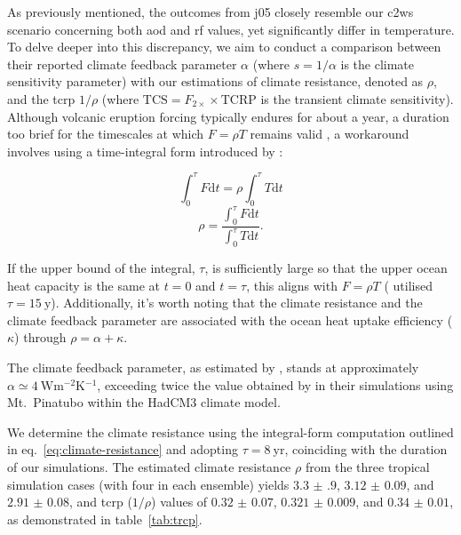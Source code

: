 \documentclass{ametsocV6.1}
\begin{document}
As previously mentioned, the outcomes from \gls{j05} closely resemble our \gls{c2ws}
scenario concerning both \gls{aod} and \gls{rf} values, yet significantly differ in
temperature. To delve deeper into this discrepancy, we aim to conduct a comparison
between their reported climate feedback parameter \(\alpha \) (where \(s=1/\alpha \) is
the climate sensitivity parameter) with our estimations of climate resistance, denoted
as \(\rho \), and the \gls{tcrp} \(1/\rho\) (where \(\mathrm{TCS}=F_{2\times}\times
\mathrm{TCRP}\) is the transient climate sensitivity). Although volcanic eruption
forcing typically endures for about a year, a duration too brief for the timescales at
which \(F=\rho T\) remains valid \citep{gregory2016}, a workaround involves using a
time-integral form introduced by \citet{merlis2014}:

\begin{equation}
  \int_0^{\tau}F \mathrm{d}t=\rho\int_{0}^{\tau}T \mathrm{d}t
\end{equation}
\begin{equation}
  \rho=\frac{\int_0^{\tau}F \mathrm{d}t}{\int_{0}^{\tau}T \mathrm{d}t}.
  \label{eq:climate-resistance}
\end{equation}

If the upper bound of the integral, \(\tau \), is sufficiently large so that the upper
ocean heat capacity is the same at \(t=0\) and \(t=\tau \), this aligns with \(F=\rho
T\) \citep{gregory2016} (\citet{merlis2014} utilised \(\tau =\SI{15}{\mathrm{y}}\)).
Additionally, it's worth noting that the climate resistance and the climate feedback
parameter are associated with the ocean heat uptake efficiency (\(\kappa \)) through
\(\rho =\alpha +\kappa \).

The climate feedback parameter, as estimated by \citet{jones2005}, stands at
approximately \(\alpha \simeq \SI{4}{\watt\metre^{-2}\kelvin^{-1}}\), exceeding twice
the value obtained by \citet{gregory2016} in their simulations using Mt.\ Pinatubo
within the HadCM3 climate model.

We determine the climate resistance using the integral-form computation outlined in
eq.~\ref{eq:climate-resistance} and adopting \(\tau =\SI{8}{\mathrm{yr}}\), coinciding
with the duration of our simulations. The estimated climate resistance \(\rho \) from
the three tropical simulation cases (with four in each ensemble) yields
\(\num{3.3(9)}\), \(\num{3.12(9)}\), and \(\num{2.91(8)}\), and \gls{tcrp} (\(1/\rho\))
values of \(\num{0.32(7)}\), \(\num{0.321(9)}\), and \(\num{0.34(1)}\), as demonstrated
in table~\ref{tab:trcp}.
\end{document}
